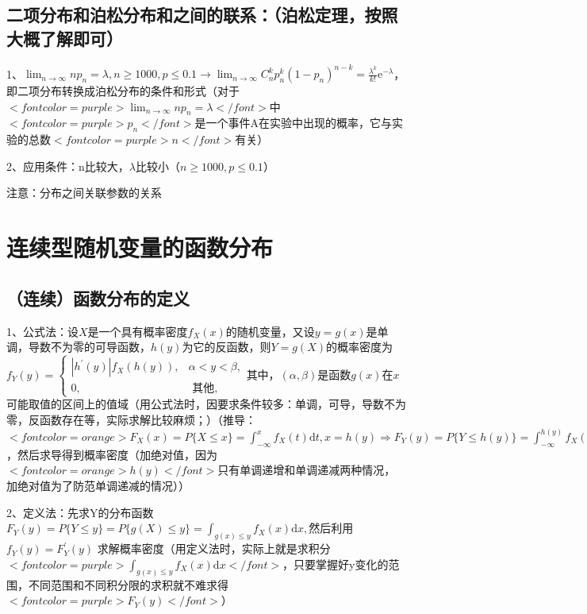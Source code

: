 \subsection{二项分布和泊松分布和之间的联系：（泊松定理，按照大概了解即可）}

1、$ \lim_{n \rightarrow \infty}np_n=\lambda, n\ge1000,p\le0.1 \rightarrow \lim _{n \rightarrow \infty} C_{n}^{k} p_{n}^{k}\left(1-p_{n}\right)^{n-k}=\frac{\lambda^{k}}{k !} \mathrm{e}^{-\lambda} $，即二项分布转换成泊松分布的条件和形式（对于$ <font color=purple>\lim_{n \rightarrow \infty}np_n=\lambda</font> $中$ <font color=purple>p_n</font> $是一个事件A在实验中出现的概率，它与实验的总数$ <font color=purple>n</font> $有关）

2、应用条件：n比较大，$ \lambda $比较小（$ n\ge1000,p\le0.1 $）

注意：分布之间关联参数的关系



\section{连续型随机变量的函数分布}



\subsection{（连续）函数分布的定义}

1、公式法：设$ X $是一个具有概率密度$ f_X(x) $的随机变量，又设$ y=g(x) $是单调，导数不为零的可导函数，$ h(y) $为它的反函数，则$ Y=g(X) $的概率密度为$ f_{Y}(y)=\left\{\begin{array}{cc}\left|h^{\prime}(y)\right| f_{X}(h(y)), & \alpha<y<\beta, \\0, & \text { 其他, }\end{array}\right. $其中，$ (\alpha,\beta) $是函数$ g(x) $在$ x $可能取值的区间上的值域（用公式法时，因要求条件较多：单调，可导，导数不为零，反函数存在等，实际求解比较麻烦；）（推导：$ <font color=orange>F_{X}(x)=P\{X \leqslant x\}=\int_{-\infty}^{x} f_{X}(t) \mathrm{d} t, x=h(y) \Rightarrow F_{Y}(y)=P\{Y \leqslant h(y)\}=\int_{-\infty}^{h(y)} f_{X}(t) \mathrm{d} t</font> $，然后求导得到概率密度（加绝对值，因为$ <font color=orange>h(y)</font> $只有单调递增和单调递减两种情况，加绝对值为了防范单调递减的情况））

2、定义法：先求Y的分布函数$ F_{Y}(y)=P\{Y \leqslant y\}=P\{g(X) \leqslant y\}=\int_{g(x) \leqslant y} f_{X}(x) \mathrm{d} x,  $然后利用$ f_{Y}(y)=F_{Y}^{\prime}(y) $ 求解概率密度（用定义法时，实际上就是求积分$ <font color=purple>\int_{g(x) \leqslant y} f_{X}(x) \mathrm{d} x</font> $，只要掌握好y变化的范围，不同范围和不同积分限的求积就不难求得$ <font color=purple>F_Y(y)</font> $）


